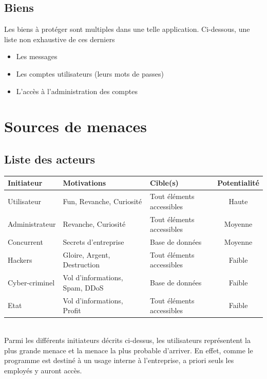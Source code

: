 \documentclass[12pt]{article}
\begin{document}
\subsection{Biens}
Les biens à protéger sont multiples dans une telle application. Ci-dessous, une liste non exhaustive de ces derniers

\begin{itemize}
\item Les messages 
\item Les comptes utilisateurs (leurs mots de passes)
\item L'accès à l'administration des comptes
\end{itemize}

\newpage
\section{Sources de menaces}

\subsection{Liste des acteurs}
\begin{tabular}{| l | l | l | c |}
  \hline			
  \textbf{Initiateur} & \textbf{Motivations} & \textbf{Cible(s)} & \textbf{Potentialité} \\
  \hline
  Utilisateur & Fun, Revanche, Curiosité & Tout éléments accessibles & Haute \\
  Administrateur & Revanche, Curiosité & Tout éléments accessibles & Moyenne \\  
  Concurrent & Secrets d'entreprise & Base de données & Moyenne \\
  Hackers & Gloire, Argent, Destruction & Tout éléments accessibles & Faible \\
  Cyber-criminel & Vol d'informations, Spam, DDoS & Base de données & Faible \\
  Etat & Vol d'informations, Profit & Tout éléments accessibles & Faible \\
  \hline  
\end{tabular}
\\

Parmi les différents initiateurs décrits ci-dessus, les utilisateurs représentent la plus grande menace et la menace la plus probable d'arriver. En effet, comme le programme est destiné à un usage interne à l'entreprise, a priori seuls les employés y auront accès.
\end{document}
